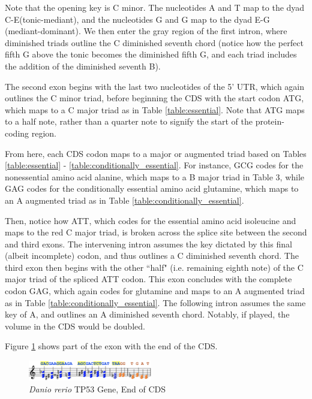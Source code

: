 \documentclass[letterpaper]{article}
\begin{document}
Note that the opening key is C minor. The nucleotides  A and T map to the dyad C-E\musFlat \;(tonic-mediant), and the nucleotides G and G map to the dyad E\musFlat-G (mediant-dominant). We then enter the gray region of the first intron, where diminished triads outline the C diminished seventh chord (notice how the perfect fifth G above the tonic becomes the diminished fifth G\musFlat, and each triad includes the addition of the diminished seventh B\musDoubleFlat).


The second exon begins with the last two nucleotides of the 5’ UTR, which again outlines the C minor triad, before beginning the CDS with the start codon ATG, which maps to a C major triad as in Table \ref{table:essential}. Note that ATG maps to a half note, rather than a quarter note to signify the start of the protein-coding region.

From here, each CDS codon maps to a major or augmented triad based on Tables  \ref{table:essential} - \ref{table:conditionally_essential}. For instance, GCG codes for the nonessential amino acid alanine, which maps to a B major triad in Table 3, while GAG codes for the conditionally essential amino acid glutamine, which maps to an A augmented triad as in Table \ref{table:conditionally_essential}.

Then, notice how ATT, which codes for the essential amino acid isoleucine and maps to the red C\musSharp\; major triad, is broken across the splice site between the second and third exons. The intervening intron assumes the key dictated by this final (albeit incomplete) codon, and thus outlines a C\musSharp \; diminished seventh chord. The third exon then begins with the other ``half" (i.e.  remaining eighth note) of the C\musSharp\; major triad of the spliced ATT codon. This exon concludes with the complete codon GAG, which again codes for glutamine and maps to an A augmented triad as in Table \ref{table:conditionally_essential}. The following intron assumes the same key of A, and outlines an A \; diminished seventh chord. Notably, if played, the volume in the CDS would be doubled.

Figure \ref{fig:danio_rerio_end_translation} shows part of the exon with the end of the CDS. 

\begin{figure}[h!]
\centering
\vspace{-3mm}
\includegraphics[width=0.48\textwidth]{images/danio_rerio_end_translation}
  \caption{\textit{Danio rerio} TP53 Gene, End of CDS}
  \label{fig:danio_rerio_end_translation}
  \vspace{-4mm}
\end{figure}
\end{document}
